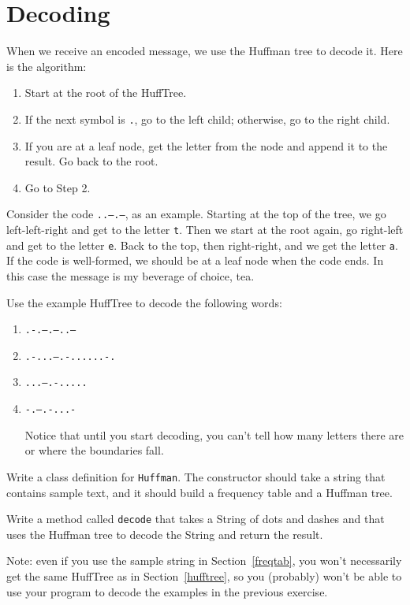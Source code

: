 \section{Decoding}

When we receive an encoded message, we use the Huffman tree to
decode it.  Here is the algorithm:

\begin{enumerate}

\item Start at the root of the HuffTree.

\item If the next symbol is {\tt .}, go to the left child; otherwise,
go to the right child.

\item If you are at a leaf node, get the letter from the node and
append it to the result.  Go back to the root.

\item Go to Step 2.

\end{enumerate}

Consider the code {\tt ..--.--}, as an example.  Starting at the
top of the tree, we go left-left-right and get to the letter {\tt t}.
Then we start at the root again, go right-left and get to the
letter {\tt e}.  Back to the top, then right-right, and we get
the letter {\tt a}.  If the code is well-formed, we should be
at a leaf node when the code ends.  In this case the message
is my beverage of choice, tea.

\begin{exercise}
Use the example HuffTree to decode the following words:

\begin{enumerate}

\item {\tt .-.--.--..---}

\item {\tt .-...--.-......-.}

\item {\tt ...--.-.....}

\item {\tt -.--.-...-}

Notice that until you start decoding, you can't tell how many
letters there are or where the boundaries fall.
\end{enumerate}
\end{exercise}


\begin{exercise}
Write a class definition for {\tt Huffman}.  The constructor should
take a string that contains sample text, and it should build a
frequency table and a Huffman tree.

Write a method called {\tt decode} that takes a String of dots
and dashes and that uses the Huffman tree to decode the String
and return the result.

Note: even if you use the sample string in Section~\ref{freqtab},
you won't necessarily get the same HuffTree as in Section~\ref{hufftree},
so you (probably) won't be able to use your program to decode
the examples in the previous exercise.
\end{exercise}


